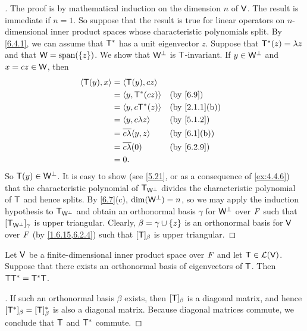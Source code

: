 \begin{proof}[]
  The proof is by mathematical induction on the dimension \(n\) of \(\mathsf{V}\).
  The result is immediate if \(n = 1\).
  So suppose that the result is true for linear operators on \(n\)-dimensional inner product spaces whose characteristic polynomials split.
  By \cref{6.4.1}, we can assume that \(\mathsf{T}^*\) has a unit eigenvector \(z\).
  Suppose that \(\mathsf{T}^*(z) = \lambda z\) and that \(\W = \spn{\set{z}}\).
  We show that \(\mathsf{W}^{\perp}\) is \(\mathsf{T}\)-invariant.
  If \(y \in \mathsf{W}^{\perp}\) and \(x = cz \in \mathsf{W}\), then
  \begin{align*}
    \inn{\T(y), x} & = \inn{\T(y), cz}                                              \\
                   & = \inn{y, \T^*(cz)}           &  & \text{(by \cref{6.9})}      \\
                   & = \inn{y, c \T^*(z)}          &  & \text{(by \cref{2.1.1}(b))} \\
                   & = \inn{y, c \lambda z}        &  & \text{(by \cref{5.1.2})}    \\
                   & = \conj{c \lambda} \inn{y, z} &  & \text{(by \cref{6.1}(b))}   \\
                   & = \conj{c \lambda} (0)        &  & \text{(by \cref{6.2.9})}    \\
                   & = 0.
  \end{align*}
  So \(\mathsf{T}(y) \in \mathsf{W}^{\perp}\).
  It is easy to show (see \cref{5.21}, or as a consequence of \cref{ex:4.4.6}) that the characteristic polynomial of \(\mathsf{T}_{\mathsf{W}^{\perp}}\) divides the characteristic polynomial of \(\mathsf{T}\) and hence splits.
  By \cref{6.7}(c), \(\dim(\mathsf{W}^{\perp}) = n\), so we may apply the induction hypothesis to \(\mathsf{T}_{\mathsf{W}^{\perp}}\) and obtain an orthonormal basis \(\gamma\) for \(\mathsf{W}^{\perp}\) over \(\mathit{F}\) such that \([\mathsf{T}_{\mathsf{W}^{\perp}}]_{\gamma}\) is upper triangular.
  Clearly, \(\beta = \gamma \cup \left\lbrace z\right\rbrace\) is an orthonormal basis for \(\mathsf{V}\) over \(\mathit{F}\) (by \cref{1.6.15,6.2.4}) such that \([\mathsf{T}]_{\beta}\) is upper triangular.
\end{proof}

\begin{cor}\label{6.4.2}
  Let \(\mathsf{V}\) be a finite-dimensional inner product space over \(\mathit{F}\) and let \(\mathsf{T} \in \mathcal{L}(\mathsf{V})\).
  Suppose that there exists an orthonormal basis of eigenvectors of \(\mathsf{T}\).
  Then \(\mathsf{T} \mathsf{T}^* = \mathsf{T}^* \mathsf{T}\).
\end{cor}

\begin{proof}[]
  If such an orthonormal basis \(\beta\) exists, then \([\mathsf{T}]_{\beta}\) is a diagonal matrix, and hence \([\mathsf{T}^*]_{\beta} = [\mathsf{T}]_{\beta}^*\) is also a diagonal matrix.
  Because diagonal matrices commute, we conclude that \(\mathsf{T}\) and \(\mathsf{T}^*\) commute.
\end{proof}

